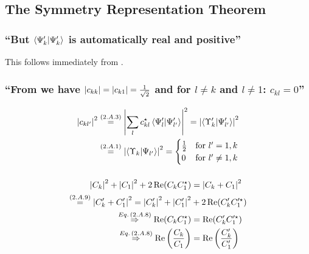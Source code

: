 \subsection{The Symmetry Representation Theorem}\label{susec:2_A}

\subsubsection{\enquote{But $\braket{\Psi_k^\prime}{\Psi_k^\prime}$ is automatically \textbf{real and positive}} }
This follows immediately from .

\subsubsection{\enquote{From  we have $\abs{c_{kk}}=\abs{c_{k1}}=\frac{1}{\sqrt{2}}$ and for $l\neq k$ and $l\neq 1$: $c_{kl}=0$} }

\begin{align*}
	\abs{c_{kl^\prime}}^2&\overset{({2.A.3})}{=}\abs{\sum\limits_{l}c_{kl}^\star \braket{\Psi_l^\prime}{\Psi_{l^\prime}^\prime}}^2=\abs{\braket{\Upsilon_k^\prime}{\Psi_{l^\prime}^\prime}}^2\\
	&\overset{({2.A.1})}{=}\abs{\braket{\Upsilon_k}{\Psi_{l^\prime}}}^2=\begin{cases}
		\frac{1}{2} &\text{for } l^\prime=1,k\\
		0&\text{for } l^\prime\neq1,k\end{cases}
\end{align*}

\subsubsection{ }
\begin{align*} 
	\abs{C_k}^2+\abs{C_1}^2+2\Re(C_k C_1^\star)&=\abs{C_k+C_1}^2\\
	\overset{({2.A.9})}{=}\abs{C_k^\prime+C_1^\prime}^2=\abs{C_k^\prime}^2+\abs{C_1^\prime}^2&+2\Re(C_k^\prime C_1^{\prime\star})\\
	\overset{Eq.\,({2.A.8})}{\Rightarrow} \Re(C_k C_1^\star)&=\Re(C_k^\prime C_1^{\prime\star})\\
	\overset{Eq.\,({2.A.8})}{\Rightarrow} \Re\left(\dfrac{C_k}{C_1}\right)&=\Re\left(\dfrac{C_k^\prime}{C_1^\prime}\right)
\end{align*}


